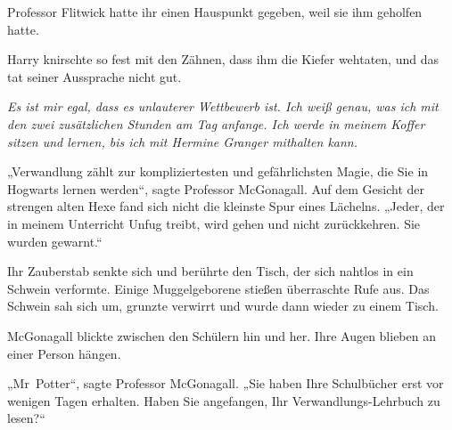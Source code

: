 Professor Flitwick hatte ihr einen Hauspunkt gegeben, weil sie ihm geholfen hatte.

Harry knirschte so fest mit den Zähnen, dass ihm die Kiefer wehtaten, und das tat seiner Aussprache nicht gut.

\emph{Es ist mir egal, dass es unlauterer Wettbewerb ist. Ich weiß genau, was ich mit den zwei zusätzlichen Stunden am Tag anfange. Ich werde in meinem Koffer sitzen und lernen, bis ich mit Hermine Granger mithalten kann.}

\later

„Verwandlung zählt zur kompliziertesten und gefährlichsten Magie, die Sie in Hogwarts lernen werden“, sagte Professor McGonagall. Auf dem Gesicht der strengen alten Hexe fand sich nicht die kleinste Spur eines Lächelns. „Jeder, der in meinem Unterricht Unfug treibt, wird gehen und nicht zurückkehren. Sie wurden gewarnt.“

Ihr Zauberstab senkte sich und berührte den Tisch, der sich nahtlos in ein Schwein verformte. Einige Muggelgeborene stießen überraschte Rufe aus. Das Schwein sah sich um, grunzte verwirrt und wurde dann wieder zu einem Tisch.

McGonagall blickte zwischen den Schülern hin und her. Ihre Augen blieben an einer Person hängen.

„Mr~Potter“, sagte Professor McGonagall. „Sie haben Ihre Schulbücher erst vor wenigen Tagen erhalten. Haben Sie angefangen, Ihr Verwandlungs-Lehrbuch zu lesen?“

